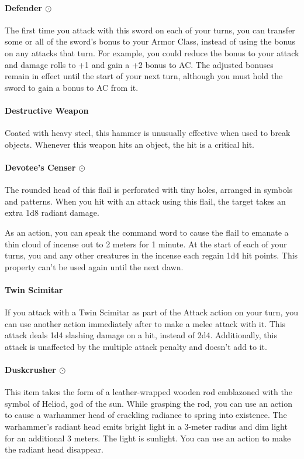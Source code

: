     \paragraph{Defender $\odot$}
        The first time you attack with this sword on each of your turns, you can transfer some or all of the sword's bonus to your Armor Class, instead of using the bonus on any attacks that turn.
        For example, you could reduce the bonus to your attack and damage rolls to +1 and gain a +2 bonus to AC.
        The adjusted bonuses remain in effect until the start of your next turn, although you must hold the sword to gain a bonus to AC from it.
    \paragraph{Destructive Weapon}
        Coated with heavy steel, this hammer is unusually effective when used to break objects.
        Whenever this weapon hits an object, the hit is a critical hit.
    \paragraph{Devotee's Censer $\odot$}
        The rounded head of this flail is perforated with tiny holes, arranged in symbols and patterns.
        When you hit with an attack using this flail, the target takes an extra 1d8 radiant damage.

        As an action, you can speak the command word to cause the flail to emanate a thin cloud of incense out to 2 meters for 1 minute.
        At the start of each of your turns, you and any other creatures in the incense each regain 1d4 hit points.
        This property can't be used again until the next dawn.
    \paragraph{Twin Scimitar}
        If you attack with a Twin Scimitar as part of the Attack action on your turn, you can use another action immediately after to make a melee attack with it.
        This attack deals 1d4 slashing damage on a hit, instead of 2d4.
        Additionally, this attack is unaffected by the multiple attack penalty and doesn't add to it.
    \paragraph{Duskcrusher $\odot$}
        This item takes the form of a leather-wrapped wooden rod emblazoned with the symbol of Heliod, god of the sun.
        While grasping the rod, you can use an action to cause a warhammer head of crackling radiance to spring into existence.
        The warhammer's radiant head emits bright light in a 3-meter radius and dim light for an additional 3 meters.
        The light is sunlight.
        You can use an action to make the radiant head disappear.

